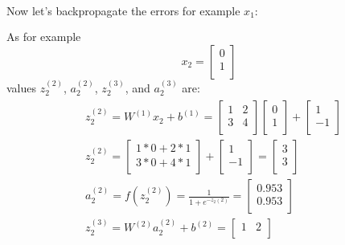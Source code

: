 \documentclass[leqno]{article}
\begin{document}
Now let's backpropagate the errors for example $x_1$:
\begin{gather*}
\begin{split}
\end{split}
\end{gather*}
As for example
\[
x_2 =
  \begin{bmatrix}
  0\\
  1\\ 
  \end{bmatrix}
\]
values $z_2^{(2)}$, $a_2^{(2)}$, $z_2^{(3)}$, and $a_2^{(3)}$ are:
\begin{gather*}
\begin{split}
&z_2^{(2)} = W^{(1)}x_2 + b^{(1)} =
  \begin{bmatrix}
  1 & 2\\
  3 & 4\\ 
  \end{bmatrix}
  \begin{bmatrix}
  0\\
  1\\ 
  \end{bmatrix}
  +
 \begin{bmatrix}
  1\\
  -1\\ 
  \end{bmatrix}
\\
&z_2^{(2)} = 
  \begin{bmatrix}
  1*0 + 2*1\\
  3*0 + 4*1\\ 
  \end{bmatrix}
  +
 \begin{bmatrix}
  1\\
  -1\\ 
  \end{bmatrix}
=
 \begin{bmatrix}
  3\\
  3\\ 
  \end{bmatrix}
\\
&a_2^{(2)} = f(z_2^{(2)}) = \frac{1}{1 + e^{-z_2{(2)}}} =
 \begin{bmatrix}
   0.953\\
   0.953\\ 
  \end{bmatrix}
\\
&z_2^{(3)} = W^{(2)}a_2^{(2)} + b^{(2)} =
 \begin{bmatrix}
   1 & 2\\
  \end{bmatrix}

\end{split}
\end{gather*}
\end{document}
